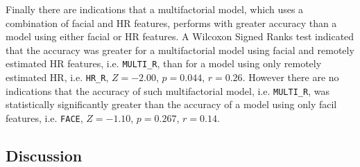 Finally there are indications that a multifactorial model, which uses a combination of facial and HR features, performs with greater accuracy than a model using either facial or HR features. A Wilcoxon Signed Ranks test indicated that the accuracy was greater for a multifactorial model using facial and remotely estimated HR features, i.e. \texttt{MULTI\_R}, than for a model using only remotely estimated HR, i.e. \texttt{HR\_R}, $Z=-2.00$, $p=0.044$, $r=0.26$. However there are no indications that the accuracy of such multifactorial model, i.e. \texttt{MULTI\_R}, was statistically significantly greater than the accuracy of a model using only facil features, i.e. \texttt{FACE}, $Z=-1.10$, $p=0.267$, $r=0.14$.

\subsection{Discussion}



